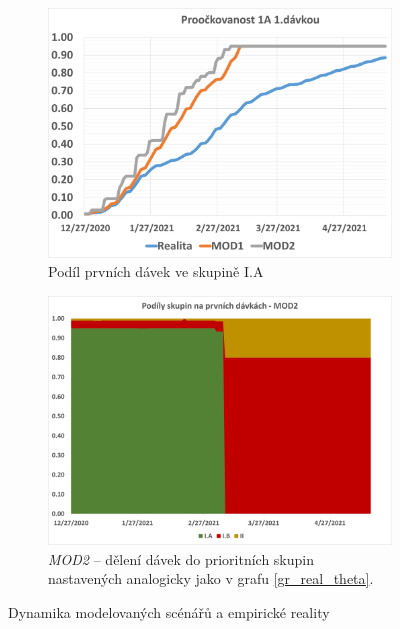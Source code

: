 \begin{figure}
\begin{subfigure}{0.45\textwidth}
\includegraphics[width=\textwidth]{prispevky/080-Logistika_ockovani/assets/vetsi_popisky/gr_1A_proockovanost}
\caption{Podíl prvních dávek ve skupině I.A}
\label{gr_mod_prvni_davka}
\end{subfigure}
%
\begin{subfigure}{0.45\textwidth}
\includegraphics[width=\textwidth]{assets/theta_mod2}
\caption{\emph{MOD2} -- dělení dávek do prioritních skupin nastavených analogicky jako v grafu \ref{gr_real_theta}.}
\label{gr_mod2_theta}
\end{subfigure}

\caption{Dynamika modelovaných scénářů a empirické reality}
\label{gr_modelace}

\end{figure}

